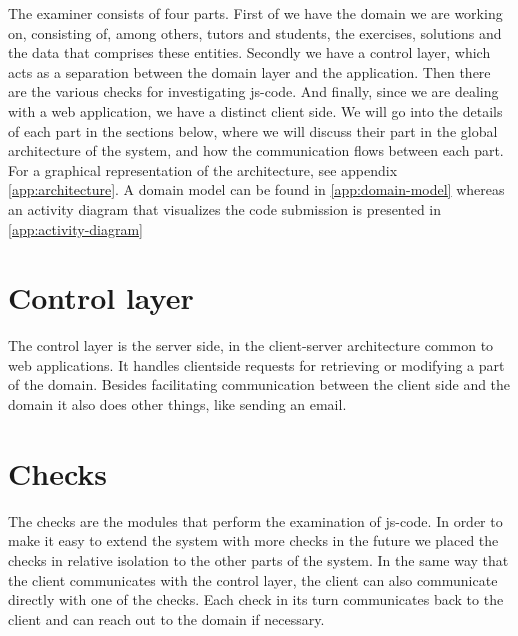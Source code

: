 %

The \gls{examiner} consists of four parts.
First of we have the domain we are working on, consisting of, among others,
tutors and students, the exercises, solutions
and the data that comprises these entities.
Secondly we have a control layer,
which acts as a separation between the domain layer and the application.
Then there are the various \glspl{check} for investigating \gls{js-code}.
And finally, since we are dealing with a web application,
we have a distinct client side.
We will go into the details of each part in the sections below,
where we will discuss their part in the global architecture of the system,
and how the communication flows between each part. For a graphical 
representation of the architecture, see appendix \ref{app:architecture}. A 
domain model can be found in \ref{app:domain-model} whereas an activity diagram 
that visualizes the code submission is presented in \ref{app:activity-diagram}

\section{Control layer}
The control layer is the server side,
in the client-server architecture common to web applications.
It handles clientside requests
for retrieving or modifying a part of the domain.
Besides facilitating communication between the client side and the domain
it also does other things, like sending an email.

\section{Checks}
The \glspl{check} are the modules that perform the examination of \gls{js-code}.
In order to make it easy to extend the system with more \glspl{check} in the future
we placed the \glspl{check} in relative isolation to the other parts of the system.
In the same way that the client communicates with the control layer,
the client can also communicate directly with one of the \glspl{check}.
Each \gls{check} in its turn communicates back to the client
and can reach out to the domain if necessary.

